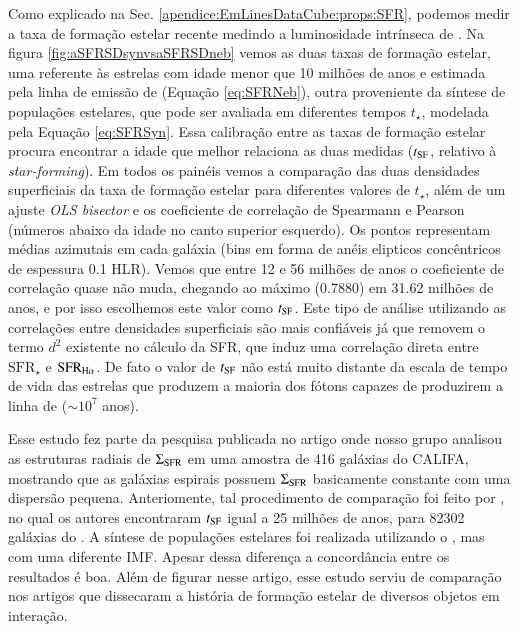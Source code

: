 Como explicado na Sec. \ref{apendice:EmLinesDataCube:props:SFR}, podemos medir a taxa de formação estelar recente medindo a luminosidade intrínseca de \Ha. Na figura \ref{fig:aSFRSDsynvsaSFRSDneb} vemos as duas taxas de formação estelar, uma referente às estrelas com idade menor que 10 milhões de anos e estimada pela linha de emissão de \Ha (Equação \ref{eq:SFRNeb}), outra proveniente da síntese de populações estelares, que pode ser avaliada em diferentes tempos $t_\star$, modelada pela Equação \ref{eq:SFRSyn}. Essa calibração entre as taxas de formação estelar procura encontrar a idade que melhor relaciona as duas medidas ($t_{\rm SF}$, relativo à {\em star-forming}). Em todos os painéis vemos a comparação das duas densidades superficiais da taxa de formação estelar para diferentes valores de $t_\star$, além de um ajuste {\em OLS bisector} e os coeficiente de correlação de Spearmann e Pearson (números abaixo da idade no canto superior esquerdo). Os pontos representam médias azimutais em cada galáxia (bins em forma de anéis elipticos concêntricos de espessura 0.1 HLR). Vemos que entre 12 e 56 milhões de anos o coeficiente de correlação quase não muda, chegando ao máximo (0.7880) em 31.62 milhões de anos, e por isso escolhemos este valor como $t_{\rm SF}$. Este tipo de análise utilizando as correlações entre densidades superficiais são mais confiáveis já que removem o termo $d^2$ existente no cálculo da SFR, que induz uma correlação direta entre $\mathrm{SFR}_\star$ e $\mathrm{SFR}_{\Ha}$. De fato o valor de $t_{\rm SF}$ não está muito distante da escala de tempo de vida das estrelas que produzem a maioria dos fótons capazes de produzirem a linha de \Ha ($\sim10^7$ anos).

Esse estudo fez parte da pesquisa publicada no artigo \citep{GonzalezDelgado.etal.2016a} onde nosso grupo analisou as estruturas radiais de $\Sigma_{\rm SFR}$ em uma amostra de 416 galáxias do CALIFA, mostrando que as galáxias espirais possuem $\Sigma_{\rm SFR}$ basicamente constante com uma dispersão pequena. Anteriomente, tal procedimento de comparação foi feito por \citet{Asari.etal.2007a}, no qual os autores encontraram $t_{\rm SF}$ igual a 25 milhões de anos, para 82302 galáxias do \SDSS. A síntese de populações estelares foi realizada utilizando o \starlight, mas com uma diferente IMF. Apesar dessa diferença a concordância entre os resultados é boa. Além de figurar nesse artigo, esse estudo serviu de comparação nos artigos \citet{CortijoFerrero.etal.2017a, CortijoFerrero.etal.2017b, CortijoFerrero.etal.2017c} que dissecaram a história de formação estelar de diversos objetos em interação.

